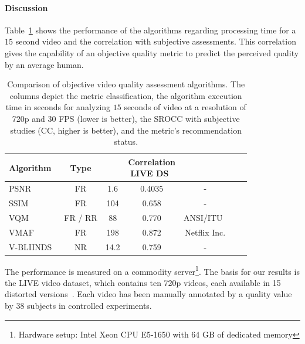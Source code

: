 \paragraph{Discussion}
Table~\ref{tab:video_quality_metrics_comparison} shows the performance of the algorithms regarding processing time for a $15$ second video and the correlation with subjective assessments. 
This correlation gives the capability of an objective quality metric to predict the perceived quality by an average human.
\begin{table}
	\centering 
	\caption[Comparison of objective video quality assessment algorithms]{Comparison of objective video quality assessment algorithms. The columns depict the metric classification, the algorithm execution time in seconds for analyzing $15$ seconds of video at a resolution of 720p and $30$ \ac{FPS} (lower is better), the \ac{SROCC} with subjective studies (CC, higher is better), and the metric's recommendation status.}
	\begin{tabular}{lcccccc}
		\textbf{Algorithm} &  \textbf{Type} & \specialcell{\textbf{Runtime} $[s]$ } &  \specialcell{\textbf{Correlation} \\ \textbf{LIVE DS}~\cite{Vu2011}}  & \specialcell{\textbf{Recommendation}}\\
		\midrule%
		PSNR      & FR      & 1.6    & 0.4035      & - \\
		SSIM~\cite{Wang2003}  & FR	& 104    & 0.658   & - \\
		VQM~\cite{Pinson2004} & FR / RR       & 88    & 0.770   & ANSI/ITU~\cite{ANSI2003,ITU2004} \\
		VMAF~\cite{Li2016} & FR & 198 & 0.872  & Netflix Inc. \\
		V-BLIINDS~\cite{Saad2014} & NR & 14.2 & 0.759  & - \\
		\midrule
	\end{tabular}
	\label{tab:video_quality_metrics_comparison}
\end{table}
The performance is measured on a commodity server\footnote{Hardware setup: Intel Xeon CPU E5-1650 with 64 GB of dedicated memory}.
The basis for our results is the LIVE video dataset, which contains ten \ac{720p} videos, each available in 15 distorted versions~\cite{Vu2011}. 
Each video has been manually annotated by a quality value by 38 subjects in controlled experiments.

